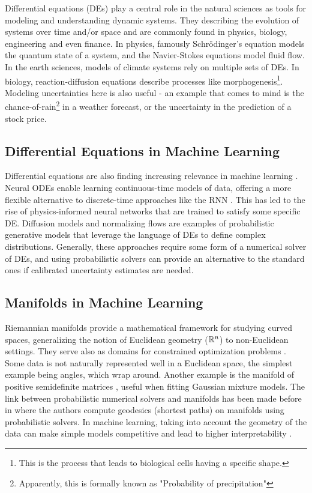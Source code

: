 Differential equations (DEs) play a central role in the natural sciences as tools for modeling and understanding dynamic systems. They describing the evolution of systems over time and/or space and are commonly found in physics, biology, engineering and even finance. In physics, famously Schrödinger's equation models the quantum state of a system, and the Navier-Stokes equations model fluid flow. In the earth sciences, models of climate systems rely on multiple sets of DEs. In biology, reaction-diffusion equations describe processes like morphogenesis\footnote{This is the process that leads to biological cells having a specific shape.}. Modeling uncertainties here is also useful - an example that comes to mind is the chance-of-rain\footnote{Apparently, this is formally known as "Probability of precipitation" } in a weather forecast, or the uncertainty in the prediction of a stock price. 

\subsection*{Differential Equations in Machine Learning}
Differential equations are also finding increasing relevance in machine learning \cite{neuralode} \cite{diffrax}. Neural ODEs enable learning continuous-time models of data, offering a more flexible alternative to discrete-time approaches like the RNN \cite{rnn}. This has led to the rise of physics-informed neural networks \cite{pinn} that are trained to satisfy some specific DE. Diffusion models \cite{diffusion} and normalizing flows \cite{nflow} are examples of probabilistic generative models that leverage the language of DEs to define complex distributions.
Generally, these approaches require some form of a numerical solver of DEs, and using probabilistic solvers can provide an alternative to the standard ones if calibrated uncertainty estimates are needed.
\subsection*{Manifolds in Machine Learning}
Riemannian manifolds provide a mathematical framework for studying curved spaces, generalizing the notion of Euclidean geometry ($\mathbb{R}^n$) to non-Euclidean settings. They serve also as domains for constrained optimization problems \cite{gaussian_robot}. Some data is not naturally represented well in a Euclidean space, the simplest example being angles, which wrap around. Another example is the manifold of positive semidefinite matrices \cite{pymanopt}, useful when fitting Gaussian mixture models.
The link between probabilistic numerical solvers and manifolds has been made before in \cite{hennig2014probabilistic} where the authors compute geodesics (shortest paths) on manifolds using probabilistic solvers. In machine learning, taking into account the geometry of the data can make simple models competitive \cite{hauberg2012geometric} and lead to higher interpretability \cite{arvanitidis2017latent}.

